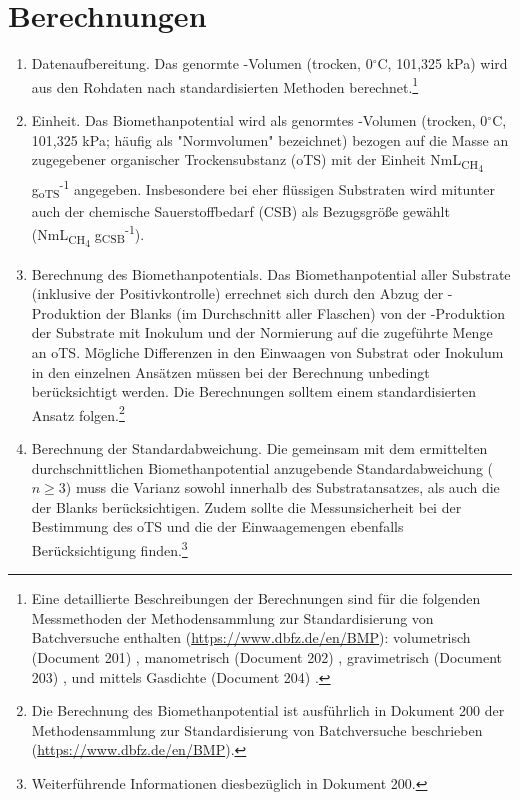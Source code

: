 \documentclass[]{article}
\begin{document}
\section{Berechnungen}
\label{sec:calculations}
\begin{enumerate}
  \item Datenaufbereitung.
    Das genormte -Volumen (trocken, 0$^\circ$C, 101,325 kPa) wird aus den Rohdaten nach standardisierten Methoden berechnet.\footnote{
      Eine detaillierte Beschreibungen der Berechnungen sind für die folgenden Messmethoden der Methodensammlung zur Standardisierung von Batchversuche enthalten (\url{https://www.dbfz.de/en/BMP}): volumetrisch (Document 201) \citep{BMPdoc201vol}, manometrisch (Document 202) \citep{BMPdoc202man}, gravimetrisch (Document 203) \citep{BMPdoc203grav}, und mittels Gasdichte (Document 204) \citep{BMPdoc204gasdens}.
    }
  \item Einheit.
	  Das Biomethanpotential wird als genormtes -Volumen (trocken, 0$^\circ$C, 101,325 kPa; häufig als "Normvolumen" bezeichnet) bezogen auf die Masse an zugegebener organischer Trockensubstanz (oTS) mit der Einheit NmL\textsubscript{CH\textsubscript{4}} g\textsubscript{oTS}\textsuperscript{-1} angegeben. Insbesondere bei eher flüssigen Substraten wird mitunter auch der chemische Sauerstoffbedarf (CSB) als Bezugsgröße gewählt (NmL\textsubscript{CH\textsubscript{4}} g\textsubscript{CSB}\textsuperscript{-1}).
  \item Berechnung des Biomethanpotentials.
    Das Biomethanpotential aller Substrate (inklusive der Positivkontrolle) errechnet sich durch den Abzug der -Produktion der Blanks (im Durchschnitt aller Flaschen) von der -Produktion der Substrate mit Inokulum und der Normierung auf die zugeführte Menge an oTS.
    Mögliche Differenzen in den Einwaagen von Substrat oder Inokulum in den einzelnen Ansätzen müssen bei der Berechnung unbedingt berücksichtigt werden.
    Die Berechnungen solltem einem standardisierten Ansatz folgen.\footnote{
      Die Berechnung des Biomethanpotential ist ausführlich in Dokument 200 der Methodensammlung zur Standardisierung von Batchversuche beschrieben (\url{https://www.dbfz.de/en/BMP}).
    }
    \item Berechnung der Standardabweichung.
    Die gemeinsam mit dem ermittelten durchschnittlichen Biomethanpotential anzugebende Standardabweichung ($n \ge 3$) muss die Varianz sowohl innerhalb des Substratansatzes, als auch die der Blanks berücksichtigen. Zudem sollte die Messunsicherheit bei der Bestimmung des oTS und die der Einwaagemengen ebenfalls Berücksichtigung finden.\footnote{
      Weiterführende Informationen diesbezüglich in Dokument 200. 
    }
\end{enumerate}
\end{document}
